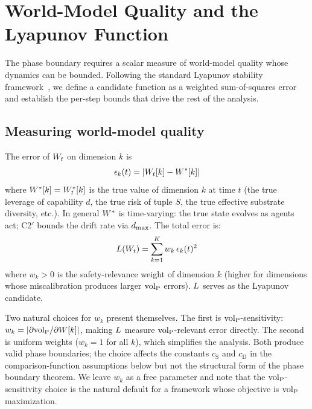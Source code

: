 \section{World-Model Quality and the Lyapunov Function}
\label{sec:lyapunov}

The phase boundary requires a scalar measure of world-model quality
whose dynamics can be bounded.  Following the standard Lyapunov
stability framework~\citep{khalil2002nonlinear}, we define a
candidate function as a weighted sum-of-squares error and establish
the per-step bounds that drive the rest of the analysis.

\subsection{Measuring world-model quality}

\begin{definition}
\label{def:wm_error}
The error of $W_t$ on dimension $k$ is
\begin{equation}
\label{eq:dim_error}
\epsilon_k(t) = |W_t[k] - W^*[k]|
\end{equation}
where $W^*[k] = W^*_t[k]$ is the true value of dimension $k$ at
time $t$ (the true leverage of capability $d$, the true risk of
tuple $S$, the true effective substrate diversity, etc.).  In general
$W^*$ is time-varying: the true state evolves as agents act; C2$'$
bounds the drift rate via $d_{\mathrm{max}}$.  The total error is:
\begin{equation}
\label{eq:lyapunov}
L(W_t) = \sum_{k=1}^{K} w_k \, \epsilon_k(t)^2
\end{equation}
where $w_k > 0$ is the safety-relevance weight of dimension $k$
(higher for dimensions whose miscalibration produces larger ${\operatorname{vol}_{\mathrm{P}}}$
errors).  $L$ serves as the Lyapunov candidate.
\end{definition}

\begin{remark}
\label{rem:weights}
Two natural choices for $w_k$ present themselves.  The first is
${\operatorname{vol}_{\mathrm{P}}}$-sensitivity: $w_k = |\partial {\operatorname{vol}_{\mathrm{P}}} / \partial W[k]|$,
making $L$ measure ${\operatorname{vol}_{\mathrm{P}}}$-relevant error directly.  The second is
uniform weights ($w_k = 1$ for all $k$), which simplifies the analysis.
Both produce valid phase boundaries; the choice affects the constants
$c_{\mathrm{S}}$ and $c_{\mathrm{D}}$ in the comparison-function
assumptions below but not the structural form of the phase boundary
theorem.  We leave $w_k$ as a free parameter and note that the
${\operatorname{vol}_{\mathrm{P}}}$-sensitivity choice is the natural default for a framework whose
objective is ${\operatorname{vol}_{\mathrm{P}}}$ maximization.
\end{remark}

